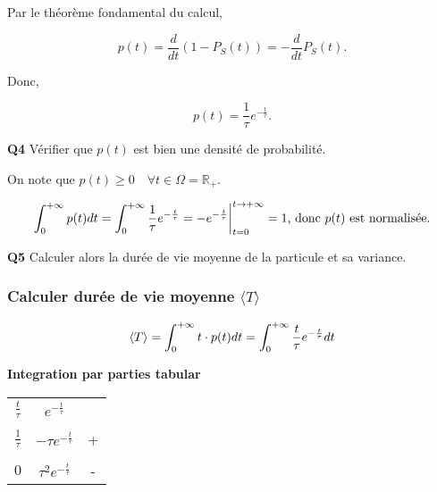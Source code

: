 \documentclass[french]{article}
\begin{document}
{		Par le théorème fondamental du calcul, 
		
		\begin{equation}
			p(t) = \frac{d}{dt} (1 - P_S(t)) = -\frac{d}{dt}P_S(t).
		\end{equation}
		
		Donc,
		
		\begin{equation}
			p(t) = \frac{1}{\tau}e^{-\frac{t}{\tau}}.
		\end{equation}
	
		\begin{tcolorbox}[colback=gray!5!white,colframe=gray!75!black]
			\textbf{\large{Q4}} Vérifier que $p(t)$ est bien une densité de probabilité.
		\end{tcolorbox}
	
		On note que $p(t) \geq 0 \quad \forall t \in \Omega = \mathbb{R}_+$.
		
		\begin{dmath}
			\int_{0}^{+\infty} p(t) dt = \int_{0}^{+\infty} \frac{1}{\tau} e^{-\frac{t}{\tau}} \\
			= -e^{-\frac{t}{\tau}} \bigg\rvert_{t=0}^{t \to +\infty} \\
			= 1 \text{, donc $p(t)$ est normalisée.}
		\end{dmath}
	
	
		\begin{tcolorbox}[colback=gray!5!white,colframe=gray!75!black]
			\textbf{\large{Q5}} Calculer alors la durée de vie moyenne de la particule et sa variance.
		\end{tcolorbox}
	
		\subsubsection*{Calculer durée de vie moyenne $\langle T \rangle$}
		
		\begin{equation}
			\langle T \rangle = \int_{0}^{+\infty} t \cdot p(t) dt\\
			= \int_{0}^{+\infty} \frac{t}{\tau}e^{-\frac{t}{\tau}} dt\\
		\end{equation}
		
		\begin{tcolorbox}[colback=yellow!5!white,colframe=yellow!75!black]
			\textbf{\large{Integration par parties tabular}}
			
			\begin{center}
				\begin{tabular}[5pt]{c c c}
					$\frac{t}{\tau}$ & $e^{-\frac{t}{\tau}}$  &  \\ \\[-1em]
					$\frac{1}{\tau}$& $-\tau e^{-\frac{t}{\tau}}$ &  +\\ \\[-1em]
					$0$& $\tau^2e^{-\frac{t}{\tau}}$ &  -\\
				\end{tabular}
			\end{center}
			

\end{tcolorbox}}
\end{document}
